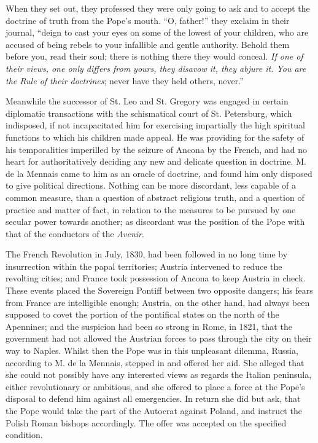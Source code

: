 When they set out, they professed they were only
going to ask and to accept the doctrine of truth from the Pope's
mouth. ``O, father!'' they exclaim in their journal, ``deign to cast your
eyes on some of the lowest of your children, who are accused of being
rebels to your infallible and gentle authority. Behold them before
you, read their soul; there is nothing there they would conceal. \emph{If
one of their views, one only differs from yours, they disavow it, they
abjure it. You are the Rule of their doctrines}; never have they
held others, never.''

Meanwhile the successor of St. Leo and St.
Gregory was engaged in certain diplomatic transactions with the
schismatical court of St. Petersburg, which indisposed, if not
incapacitated him for exercising impartially the high spiritual
functions to which his children made appeal. He was providing for the
safety of his temporalities imperilled by the seizure of Ancona by the
French, and had no heart for authoritatively deciding any new and
delicate question in doctrine. M. de la Mennais came to him as an
oracle of doctrine, and found him only disposed to give political
directions. Nothing can be more discordant, less capable of a common
measure, than a question of abstract religious truth, and a question
of practice and matter of fact, in relation to the measures to be
pursued by one secular power towards another; as discordant was the
position of the Pope with that of the conductors of the \emph{Avenir}.

The French Revolution in July, 1830, had been
followed in no long time by insurrection within the papal territories;
Austria intervened to reduce the revolting cities; and France
took possession of Ancona to keep Austria in check. These events
placed the Sovereign Pontiff between two opposite dangers; his fears
from France are intelligible enough; Austria, on the other hand, had
always been supposed to covet the portion of the pontifical states on
the north of the Apennines; and the suspicion had been so strong in
Rome, in 1821, that the government had not allowed the Austrian forces
to pass through the city on their way to Naples. Whilst then the Pope
was in this unpleasant dilemma, Russia, according to M. de la Mennais,
stepped in and offered her aid. She alleged that she could not
possibly have any interested views as regards the Italian peninsula,
either revolutionary or ambitious, and she offered to place a force at
the Pope's disposal to defend him against all emergencies. In return
she did but ask, that the Pope would take the part of the Autocrat
against Poland, and instruct the Polish Roman bishops accordingly. The
offer was accepted on the specified condition.

